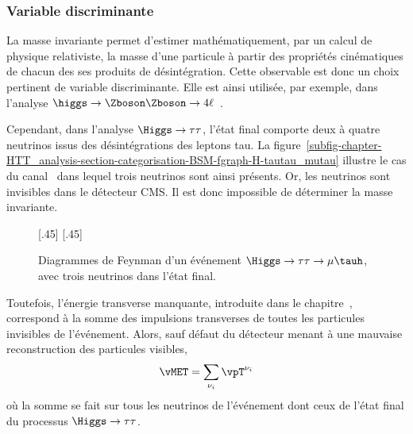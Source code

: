 \subsubsection{Variable discriminante}
La masse invariante permet d'estimer mathématiquement, par un calcul de physique relativiste, la masse d'une particule à partir des propriétés cinématiques de chacun des ses produits de désintégration.
Cette observable est donc un choix pertinent de variable discriminante.
Elle est ainsi utilisée, par exemple, dans l'analyse $\higgs\to\Zboson\Zboson\to4\ell$~\cite{CMS-PAS-HIG-13-002}.
\par
Cependant, dans l'analyse $\Higgs\to\tau\tau$, l'état final comporte deux à quatre neutrinos issus des désintégrations des leptons tau.
La figure~\ref{subfig-chapter-HTT_analysis-section-categorisation-BSM-fgraph-H-tautau_mutau} illustre le cas du canal \mu\tauh\ dans lequel trois neutrinos sont ainsi présents.
Or, les neutrinos sont invisibles dans le détecteur CMS.
Il est donc impossible de déterminer la masse invariante.
\begin{figure}[h]
\centering
\vspace{\baselineskip}

[.45\textwidth]
{}
\hfill
{}[.45\textwidth]
{}

\caption{Diagrammes de Feynman d'un événement $\Higgs\to\tau\tau\to\mu\tauh$, avec trois neutrinos dans l'état final.}
\label{fig-chapter-HTT_analysis-section-categorisation-BSM-fgraph-H-tautau_mutau-for_mTtot}
\end{figure}
\par
Toutefois, l'énergie transverse manquante, introduite dans le chapitre~, correspond à la somme des impulsions transverses de toutes les particules invisibles de l'événement.
Alors, sauf défaut du détecteur menant à une mauvaise reconstruction des particules visibles,
\begin{equation}
\vMET = \sum_{\nu_i} \vpT^{\nu_i}
\end{equation}
où la somme se fait sur tous les neutrinos de l'événement dont ceux de l'état final du processus $\Higgs\to\tau\tau$.
\par
